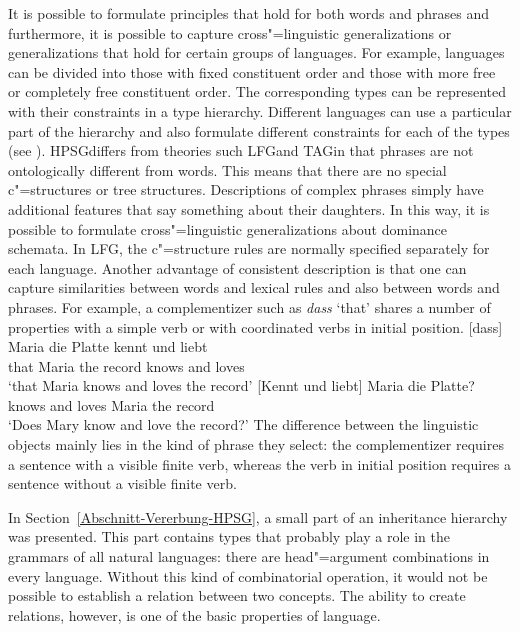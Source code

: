 It is possible to formulate principles that hold for both words and phrases and furthermore, it is possible to capture
cross"=linguistic generalizations or generalizations that hold for certain groups of languages. For example, languages can be divided
into those with fixed constituent order and those with more free or completely free constituent order. The corresponding types can be represented
with their constraints in a type hierarchy. Different languages can use a particular part of the hierarchy and also formulate
different constraints for each of the types (see \citealp[Section~9.2]{AW98a}).
HPSG\indexhpsg differs from theories such LFG\indexlfg and TAG\indextag in that phrases are not
ontologically different from words. This means that there are no special c"=structures or tree structures. Descriptions of complex phrases simply have additional
features that say something about their daughters. In this way, it is possible to formulate cross"=linguistic generalizations
about dominance schemata. In LFG, the c"=structure rules are normally specified separately for each language.
Another advantage of consistent description is that one can capture similarities between words and lexical rules and also between
words and phrases. For example, a complementizer such as \emph{dass} `that' shares a number of
properties with a simple verb or with coordinated verbs in initial position.
\eal
\ex
\gll {}[dass] Maria die Platte kennt und liebt\\
	 {}\spacebr{}that Maria the record knows and loves\\
\glt `that Maria knows and loves the record'
\ex 
\gll {}[Kennt und liebt] Maria die Platte?\\
	 {}\spacebr{}knows and loves Maria the record\\
\glt `Does Mary know and love the record?'
\zl
The difference between the linguistic objects mainly lies in the kind of phrase they select: the complementizer requires a sentence
with a visible finite verb, whereas the verb in initial position requires a sentence without a visible finite verb.

In Section~\ref{Abschnitt-Vererbung-HPSG}, a small part of an inheritance hierarchy was
presented. This part contains types
that probably play a role in the grammars of all natural languages: there are head"=argument combinations in every language. Without this
kind of combinatorial operation, it would not be possible to establish a relation between two concepts. The ability to create relations, however, is
one of the basic properties of language.

